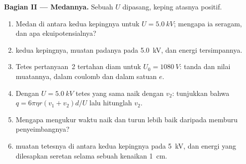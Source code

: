 \begin{problem}
\medskip
\noindent\textbf{Bagian II --- Medannya.}
Sebuah  $U$ dipasang, keping atasnya positif.
\begin{enumerate}[resume]
  \item Medan di antara kedua kepingnya untuk $U = \qty{5.0}{kV}$; mengapa ia
        seragam, dan apa ekuipotensialnya?
  \item {} kedua kepingnya, muatan padanya pada \qty{5.0}{kV}, dan
        energi tersimpannya.
  \item Tetes pertanyaan~2 tertahan diam untuk $U_0 = \qty{1080}{V}$:
        tanda dan nilai muatannya, dalam coulomb dan dalam satuan $e$.
  \item Dengan $U = \qty{5.0}{kV}$ tetes yang sama naik dengan $v_2$: tunjukkan
        bahwa $q = 6\pi\eta r(v_1 + v_2)d/U$ lalu hitunglah $v_2$.
  \item Mengapa mengukur waktu naik dan turun lebih baik daripada memburu
         penyeimbangnya?
  \item {} muatan tetesnya di antara kedua kepingnya pada
        \qty{5}{kV}, dan energi yang dilesapkan seretan selama sebuah kenaikan
        \qty{1}{cm}.
\end{enumerate}


\end{problem}
